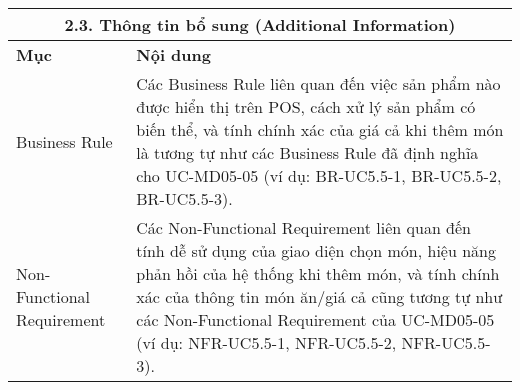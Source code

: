 \begin{longtable}{|m{4cm}|p{11cm}|}
\hline
\multicolumn{2}{|c|}{\textbf{2.3. Thông tin bổ sung (Additional Information)}} \\
\hline
\textbf{Mục} & \textbf{Nội dung} \\
\hline
Business Rule & Các Business Rule liên quan đến việc sản phẩm nào được hiển thị trên POS, cách xử lý sản phẩm có biến thể, và tính chính xác của giá cả khi thêm món là tương tự như các Business Rule đã định nghĩa cho UC-MD05-05 (ví dụ: BR-UC5.5-1, BR-UC5.5-2, BR-UC5.5-3). \\
\hline
Non-Functional Requirement & Các Non-Functional Requirement liên quan đến tính dễ sử dụng của giao diện chọn món, hiệu năng phản hồi của hệ thống khi thêm món, và tính chính xác của thông tin món ăn/giá cả cũng tương tự như các Non-Functional Requirement của UC-MD05-05 (ví dụ: NFR-UC5.5-1, NFR-UC5.5-2, NFR-UC5.5-3). \\
\hline
\end{longtable}

